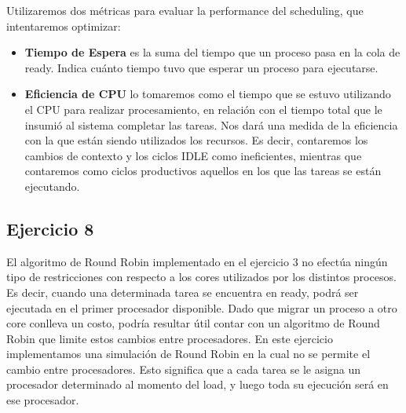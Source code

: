 \noindent
Utilizaremos dos métricas para evaluar la performance del scheduling, que intentaremos optimizar:
\begin{itemize}
	\item \textbf{Tiempo de Espera} es la suma del tiempo que un proceso pasa en la cola de ready. Indica cuánto tiempo tuvo que esperar un proceso para ejecutarse.
	\item \textbf{Eficiencia de CPU} lo tomaremos como el tiempo que se estuvo utilizando el CPU para realizar procesamiento, en relación con el tiempo total que le insumió al sistema completar las tareas. Nos dará una medida de la eficiencia con la que están siendo utilizados los recursos. Es decir, contaremos los cambios de contexto y los ciclos IDLE como ineficientes, mientras que contaremos como ciclos productivos aquellos en los que las tareas se están ejecutando.
\end{itemize}


\subsection{Ejercicio 8}

El algoritmo de Round Robin implementado en el ejercicio 3 no efectúa ningún tipo de restricciones con respecto a los cores utilizados por los distintos procesos. Es decir, cuando una determinada tarea se encuentra en ready, podrá ser ejecutada en el primer procesador disponible. Dado que migrar un proceso a otro core conlleva un costo, podría resultar útil contar con un algoritmo de Round Robin que limite estos cambios entre procesadores. En este ejercicio implementamos una simulación de Round Robin en la cual no se permite el cambio entre procesadores. Esto significa que a cada tarea se le asigna un procesador determinado al momento del load, y luego toda su ejecución será en ese procesador.\\

